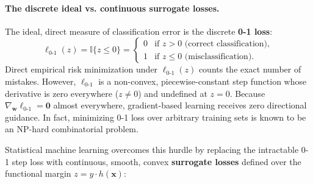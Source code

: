 \paragraph{The discrete ideal vs. continuous surrogate losses.}
The ideal, direct measure of classification error is the discrete \textbf{0-1 loss}:
\begin{equation}
\ell_{0\text{-}1}(z) = \mathbb{I}\{z \le 0\} = \begin{cases} 0 & \text{if } z > 0 \text{ (correct classification)}, \\ 1 & \text{if } z \le 0 \text{ (misclassification)}. \end{cases}
\label{eq:0_1_loss_def}
\end{equation}
Direct empirical risk minimization under $\ell_{0\text{-}1}(z)$ counts the exact number of mistakes. However, $\ell_{0\text{-}1}$ is a non-convex, piecewise-constant step function whose derivative is zero everywhere ($z \ne 0$) and undefined at $z = 0$. Because $\nabla_\mathbf{w} \ell_{0\text{-}1} = \mathbf{0}$ almost everywhere, gradient-based learning receives zero directional guidance. In fact, minimizing 0-1 loss over arbitrary training sets is known to be an NP-hard combinatorial problem.

Statistical machine learning overcomes this hurdle by replacing the intractable 0-1 step loss with continuous, smooth, convex \textbf{surrogate losses} defined over the functional margin $z = y \cdot h(\mathbf{x})$:

